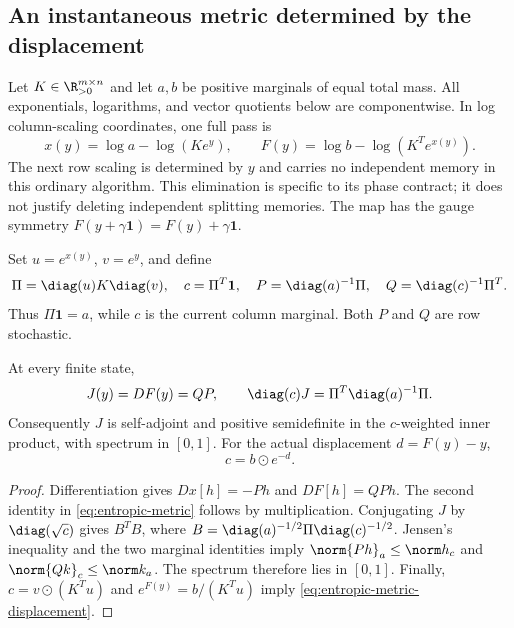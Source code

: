 \subsection{An instantaneous metric determined by the displacement}
Let $K\in\R_{>0}^{m\times n}$ and let $a,b$ be positive marginals of equal
total mass. All exponentials, logarithms, and vector quotients below are
componentwise. In log column-scaling coordinates, one full pass is
\begin{equation}
 x(y)=\log a-\log(Ke^y),\qquad
 F(y)=\log b-\log(K^Te^{x(y)}).
 \label{eq:entropic-map}
\end{equation}
The next row scaling is determined by $y$ and carries no independent memory
in this ordinary algorithm. This elimination is specific to its phase
contract; it does not justify deleting independent splitting memories.
The map has the gauge symmetry $F(y+\gamma\mathbf1)=F(y)+\gamma\mathbf1$.

Set $u=e^{x(y)}$, $v=e^y$, and define
\begin{equation}
 \Pi=\diag(u)K\diag(v),\quad c=\Pi^T\mathbf1,\quad
 P=\diag(a)^{-1}\Pi,\quad Q=\diag(c)^{-1}\Pi^T.
 \label{eq:entropic-conditionals}
\end{equation}
Thus $\Pi\mathbf1=a$, while $c$ is the current column marginal. Both
$P$ and $Q$ are row stochastic.

\begin{proposition}
\label{prop:entropic-metric}
At every finite state,
\begin{equation}
 J(y)=DF(y)=QP,\qquad
 \diag(c)J=\Pi^T\diag(a)^{-1}\Pi.
 \label{eq:entropic-metric}
\end{equation}
Consequently $J$ is self-adjoint and positive semidefinite in the
$c$-weighted inner product, with spectrum in $[0,1]$. For the actual
displacement $d=F(y)-y$,
\begin{equation}
 c=b\odot e^{-d}. \label{eq:entropic-metric-displacement}
\end{equation}
\end{proposition}
\begin{proof}
Differentiation gives $Dx[h]=-Ph$ and $DF[h]=QPh$.
The second identity in \eqref{eq:entropic-metric} follows by multiplication.
Conjugating $J$ by $\diag(\sqrt c)$ gives $B^TB$, where
$B=\diag(a)^{-1/2}\Pi\diag(c)^{-1/2}$. Jensen's inequality and the two
marginal identities imply
$\norm{Ph}_a\leq\norm h_c$ and $\norm{Qk}_c\leq\norm k_a$.
The spectrum therefore lies in $[0,1]$. Finally,
$c=v\odot(K^Tu)$ and $e^{F(y)}=b/(K^Tu)$ imply
\eqref{eq:entropic-metric-displacement}.
\end{proof}

